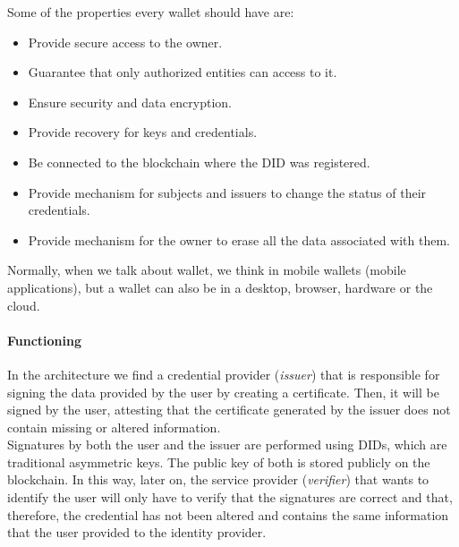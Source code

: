\documentclass[a4paper, 12pt]{article} %
\begin{document}
                    Some of the properties every wallet should have are:
                    \begin{itemize}
                        \item Provide secure access to the owner.
                        \item Guarantee that only authorized entities can access to it.
                        \item Ensure security and data encryption.
                        \item Provide recovery for keys and credentials.
                        \item Be connected to the blockchain where the DID was registered.
                        \item Provide mechanism for subjects and issuers to change the status of their credentials.
                        \item Provide mechanism for the owner to erase all the data associated with them.
                    \end{itemize}
                    Normally, when we talk about wallet, we think in mobile wallets (mobile applications), but a wallet can also be in a desktop, browser, hardware or the cloud.
                
                \paragraph{Functioning}
                    In the architecture\cite{how-to-ssi} we find a credential provider (\textit{issuer}) that is responsible for signing the data provided by the user by creating a certificate. Then, it will be signed by the user, attesting that the certificate generated by the issuer does not contain missing or altered information.\\
                    
                    Signatures by both the user and the issuer are performed using DIDs, which are traditional asymmetric keys. The public key of both is stored publicly on the blockchain. In this way, later on, the service provider (\textit{verifier}) that wants to identify the user will only have to verify that the signatures are correct and that, therefore, the credential has not been altered and contains the same information that the user provided to the identity provider.\\
                    
\end{document}
